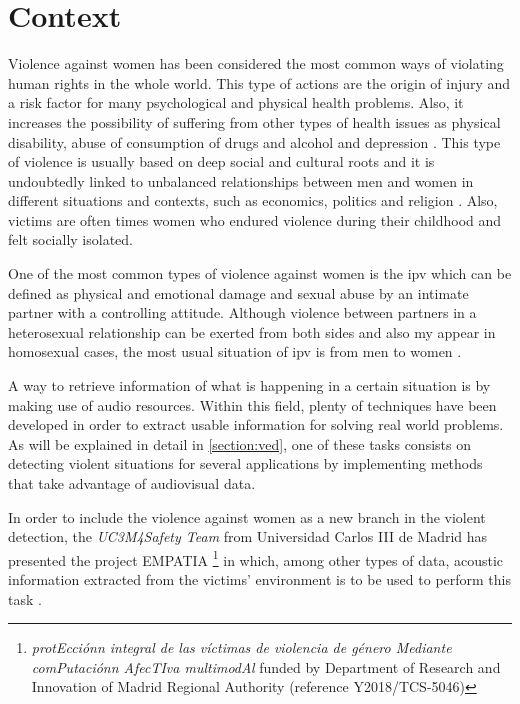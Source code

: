 \section{Context}

	Violence against women has been considered the most common ways of violating human rights in the whole world. This type of actions are the origin of injury and a risk factor for many psychological and physical health problems. Also, it increases the possibility of suffering from other types of health issues as physical disability, abuse of consumption of drugs and alcohol and depression \cite{Heise1999}\cite{Watts2002}. This type of violence is usually based on deep social and cultural roots and it is undoubtedly linked to unbalanced relationships between men and women in different situations and contexts, such as economics, politics and religion \cite{Blanco2004}. Also, victims are often times  women who endured violence during their childhood and felt socially isolated. %
	
	One of the most common types of violence against women is the \acrfull{ipv} which can be defined as physical and emotional damage and sexual abuse by an intimate partner with a controlling attitude. Although violence between partners in a heterosexual relationship can be exerted from both sides and also my appear in homosexual cases, the most usual situation of \acrshort{ipv} is from men to women \cite{WorldHealtOrganization2012}.

	A way to retrieve information of what is happening in a certain situation is by making use of audio resources. Within this field, plenty of techniques have been developed in order to extract usable information for solving real world problems. As will be explained in detail in \ref{section:ved}, one of these tasks consists on detecting violent situations for several applications by implementing methods that take advantage of audiovisual data.
	
	In order to include the violence against women as a new branch in the violent detection, the \textit{UC3M4Safety Team} from Universidad Carlos III de Madrid has presented the project EMPATIA \footnote{\textit{protEcciónn integral de las víctimas de violencia de género Mediante comPutaciónn AfecTIva multimodAl} funded by Department  of  Research  and Innovation of Madrid Regional Authority (reference  Y2018/TCS-5046)} in which, among other types of data, acoustic information extracted from the victims' environment is to be used to perform this task \cite{UC3M4SafetyTeam2018}.

